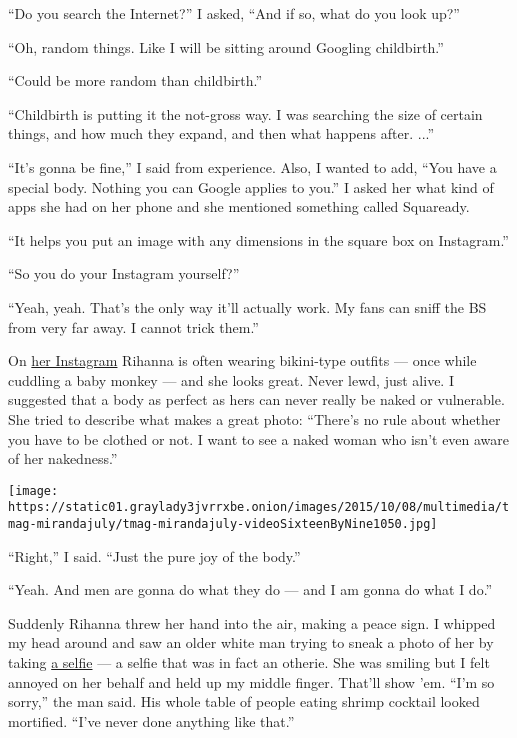 ``Do you search the Internet?'' I asked, ``And if so, what do you look
up?''

``Oh, random things. Like I will be sitting around Googling
childbirth.''

``Could be more random than childbirth.''

``Childbirth is putting it the not-gross way. I was searching the size
of certain things, and how much they expand, and then what happens
after. ...''

``It's gonna be fine,'' I said from experience. Also, I wanted to add,
``You have a special body. Nothing you can Google applies to you.'' I
asked her what kind of apps she had on her phone and she mentioned
something called Squaready.

``It helps you put an image with any dimensions in the square box on
Instagram.''

``So you do your Instagram yourself?''

``Yeah, yeah. That's the only way it'll actually work. My fans can sniff
the BS from very far away. I cannot trick them.''

On \href{https://instagram.com/badgalriri/}{her Instagram} Rihanna is
often wearing bikini-type outfits --- once while cuddling a baby monkey
--- and she looks great. Never lewd, just alive. I suggested that a body
as perfect as hers can never really be naked or vulnerable. She tried to
describe what makes a great photo: ``There's no rule about whether you
have to be clothed or not. I want to see a naked woman who isn't even
aware of her nakedness.''

\texttt{[image: https://static01.graylady3jvrrxbe.onion/images/2015/10/08/multimedia/tmag-mirandajuly/tmag-mirandajuly-videoSixteenByNine1050.jpg]}

``Right,'' I said. ``Just the pure joy of the body.''

``Yeah. And men are gonna do what they do --- and I am gonna do what I
do.''

Suddenly Rihanna threw her hand into the air, making a peace sign. I
whipped my head around and saw an older white man trying to sneak a
photo of her by taking
\href{https://twitter.com/joecoscarelli/status/653600711410888705}{a
selfie} --- a selfie that was in fact an otherie. She was smiling but I
felt annoyed on her behalf and held up my middle finger. That'll show
'em. ``I'm so sorry,'' the man said. His whole table of people eating
shrimp cocktail looked mortified. ``I've never done anything like
that.''

